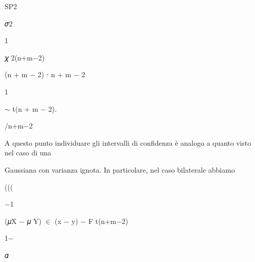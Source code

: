 \documentclass[a4paper,portrait,12pt]{article}
\begin{document}
\begin{flushleft}
SP2
\end{flushleft}


\begin{flushleft}
𝜎2
\end{flushleft}





1


\begin{flushleft}
𝜒 2(n+m$-$2)
\end{flushleft}





\begin{flushleft}
(n + m $-$ 2) ⋅ n + m $-$ 2
\end{flushleft}


1





\begin{flushleft}
$\sim$ t(n + m $-$ 2).
\end{flushleft}





\begin{flushleft}
/n+m$-$2
\end{flushleft}





\begin{flushleft}
A questo punto individuare gli intervalli di confidenza \`{e} analogo a quanto visto nel caso di una
\end{flushleft}


\begin{flushleft}
Gaussiana con varianza ignota. In particolare, nel caso bilaterale abbiamo
\end{flushleft}





(((





$-$1


\begin{flushleft}
(𝜇X $-$ 𝜇 Y) $\in$ (x $-$ y) $-$ F t(n+m$-$2)
\end{flushleft}


1$-$





\begin{flushleft}
𝛼
\end{flushleft}
\end{document}
